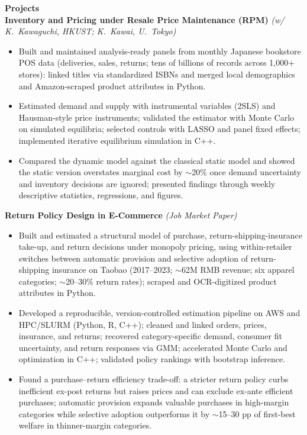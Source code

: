 \documentclass[11pt,letterpaper]{article}
\begin{document}
{\large \textbf{Projects}}\\[-0.5pt]
\textbf{Inventory and Pricing under Resale Price Maintenance (RPM)} \textit{(w/ K.\ Kawaguchi, HKUST; K.\ Kawai, U.\ Tokyo)}\\
\vspace{-6pt}
\begin{itemize}
  \item Built and maintained analysis-ready panels from monthly Japanese bookstore POS data (deliveries, sales, returns; tens of billions of records across 1{,}000+ stores): linked titles via standardized ISBNs and merged local demographics and Amazon-scraped product attributes in Python.
  \item Estimated demand and supply with instrumental variables (2SLS) and Hausman-style price instruments; validated the estimator with Monte Carlo on simulated equilibria; selected controls with LASSO and panel fixed effects; implemented iterative equilibrium simulation in C++.
  \item Compared the dynamic model against the classical static model and showed the static version overstates marginal cost by \(\sim\)20\% once demand uncertainty and inventory decisions are ignored; presented findings through weekly descriptive statistics, regressions, and figures.
\end{itemize}
\vspace{-3pt}
\textbf{Return Policy Design in E-Commerce} \textit{(Job Market Paper)}\\
\vspace{-6pt}
\begin{itemize}
  \item Built and estimated a structural model of purchase, return-shipping-insurance take-up, and return decisions under monopoly pricing, using within-retailer switches between automatic provision and selective adoption of return-shipping insurance on Taobao (2017--2023; \(\sim\)62M RMB revenue; six apparel categories; \(\sim\)20--30\% return rates); scraped and OCR-digitized product attributes in Python.
  \item Developed a reproducible, version-controlled estimation pipeline on AWS and HPC/SLURM (Python, R, C++); cleaned and linked orders, prices, insurance, and returns; recovered category-specific demand, consumer fit uncertainty, and return responses via GMM; accelerated Monte Carlo and optimization in C++; validated policy rankings with bootstrap inference.
  \item Found a purchase--return efficiency trade-off: a stricter return policy curbs inefficient ex-post returns but raises prices and can exclude ex-ante efficient purchases; automatic provision expands valuable purchases in high-margin categories while selective adoption outperforms it by \(\sim\)15--30 pp of first-best welfare in thinner-margin categories.
\end{itemize}
\end{document}
